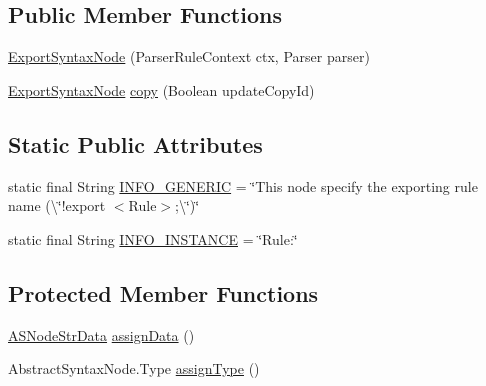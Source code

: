 \subsection*{Public Member Functions}
\begin{DoxyCompactItemize}
\item 
\hyperlink{classit_1_1emarolab_1_1cagg_1_1core_1_1language_1_1syntax_1_1abstractTree_1_1syntaxNodeType_1_1ExportSyntaxNode_afaba6bbc0650c8263df9217ad59043ef}{Export\-Syntax\-Node} (Parser\-Rule\-Context ctx, Parser parser)
\item 
\hyperlink{classit_1_1emarolab_1_1cagg_1_1core_1_1language_1_1syntax_1_1abstractTree_1_1syntaxNodeType_1_1ExportSyntaxNode}{Export\-Syntax\-Node} \hyperlink{classit_1_1emarolab_1_1cagg_1_1core_1_1language_1_1syntax_1_1abstractTree_1_1syntaxNodeType_1_1ExportSyntaxNode_aefd84152da519802ea51f383f20d4170}{copy} (Boolean update\-Copy\-Id)
\end{DoxyCompactItemize}
\subsection*{Static Public Attributes}
\begin{DoxyCompactItemize}
\item 
static final String \hyperlink{classit_1_1emarolab_1_1cagg_1_1core_1_1language_1_1syntax_1_1abstractTree_1_1syntaxNodeType_1_1ExportSyntaxNode_aaca8bfb824ff0bef296abdf16f0d5f57}{I\-N\-F\-O\-\_\-\-G\-E\-N\-E\-R\-I\-C} = \char`\"{}This node specify the exporting rule name (\textbackslash{}\char`\"{}!export $<$Rule$>$;\textbackslash{}\char`\"{})\char`\"{}
\item 
static final String \hyperlink{classit_1_1emarolab_1_1cagg_1_1core_1_1language_1_1syntax_1_1abstractTree_1_1syntaxNodeType_1_1ExportSyntaxNode_a625a6003b460943010fb01262198472a}{I\-N\-F\-O\-\_\-\-I\-N\-S\-T\-A\-N\-C\-E} = \char`\"{}Rule\-:\char`\"{}
\end{DoxyCompactItemize}
\subsection*{Protected Member Functions}
\begin{DoxyCompactItemize}
\item 
\hyperlink{classit_1_1emarolab_1_1cagg_1_1core_1_1language_1_1syntax_1_1abstractTree_1_1AbstractDataFactory_1_1ASNodeStrData}{A\-S\-Node\-Str\-Data} \hyperlink{classit_1_1emarolab_1_1cagg_1_1core_1_1language_1_1syntax_1_1abstractTree_1_1syntaxNodeType_1_1ExportSyntaxNode_a8d2839560ef596e2a4bc4d3d000fd335}{assign\-Data} ()
\item 
Abstract\-Syntax\-Node.\-Type \hyperlink{classit_1_1emarolab_1_1cagg_1_1core_1_1language_1_1syntax_1_1abstractTree_1_1syntaxNodeType_1_1ExportSyntaxNode_a4b7acb4f1548cd2cca687aa7a1414cc4}{assign\-Type} ()
\end{DoxyCompactItemize}


